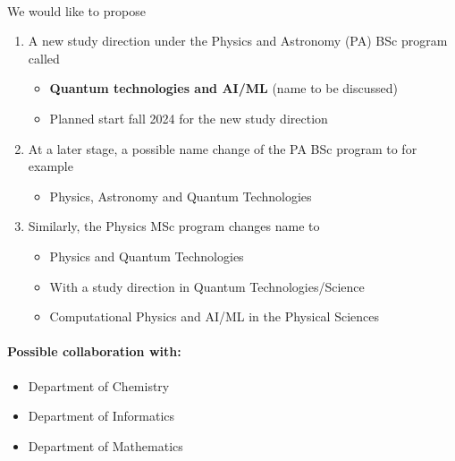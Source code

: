 \documentclass[%
oneside,                 %
final,                   %
10pt]{article}
\begin{document}
\paragraph{}
We would like to propose
\begin{enumerate}
\item A new study direction under the Physics and Astronomy (PA) BSc program called
\begin{itemize}

  \item \textbf{Quantum technologies and AI/ML} (name to be discussed)

  \item Planned start fall 2024 for the new study direction

\end{itemize}

\noindent
\item At a later stage, a possible name change of the PA BSc program to for example
\begin{itemize}

  \item Physics, Astronomy and Quantum Technologies

\end{itemize}

\noindent
\item Similarly, the Physics MSc program changes name to
\begin{itemize}

  \item Physics and Quantum Technologies

  \item With a study direction in Quantum Technologies/Science

  \item Computational Physics and AI/ML in the Physical Sciences
\end{itemize}

\noindent
\end{enumerate}

\noindent




\paragraph{Possible collaboration with:}

\begin{itemize}
 \item Department of Chemistry

 \item Department of Informatics

 \item Department of Mathematics
\end{itemize}
\end{document}
